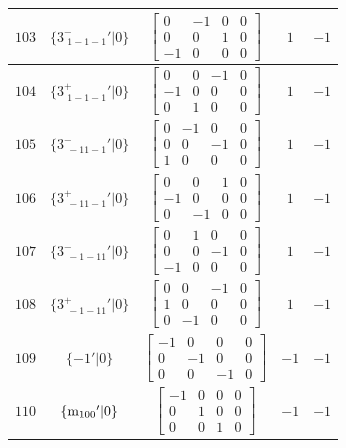 \documentclass[fleqn,8pt]{jsarticle}
\begin{document}
\begin{longtable}{ccccc}
$ 103 $ & $ \{3^{-}_{\,\,1-1-1}{}'|0\} $ & $ \begin{bmatrix} 0 & -1 & 0 & 0 \\ 0 & 0 & 1 & 0 \\ -1 & 0 & 0 & 0 \end{bmatrix} $ & $ 1 $ & $ -1 $ \\ \hline
$ 104 $ & $ \{3^{+}_{\,\,1-1-1}{}'|0\} $ & $ \begin{bmatrix} 0 & 0 & -1 & 0 \\ -1 & 0 & 0 & 0 \\ 0 & 1 & 0 & 0 \end{bmatrix} $ & $ 1 $ & $ -1 $ \\ \hline
$ 105 $ & $ \{3^{-}_{\,\,-11-1}{}'|0\} $ & $ \begin{bmatrix} 0 & -1 & 0 & 0 \\ 0 & 0 & -1 & 0 \\ 1 & 0 & 0 & 0 \end{bmatrix} $ & $ 1 $ & $ -1 $ \\ \hline
$ 106 $ & $ \{3^{+}_{\,\,-11-1}{}'|0\} $ & $ \begin{bmatrix} 0 & 0 & 1 & 0 \\ -1 & 0 & 0 & 0 \\ 0 & -1 & 0 & 0 \end{bmatrix} $ & $ 1 $ & $ -1 $ \\ \hline
$ 107 $ & $ \{3^{-}_{\,\,-1-11}{}'|0\} $ & $ \begin{bmatrix} 0 & 1 & 0 & 0 \\ 0 & 0 & -1 & 0 \\ -1 & 0 & 0 & 0 \end{bmatrix} $ & $ 1 $ & $ -1 $ \\ \hline
$ 108 $ & $ \{3^{+}_{\,\,-1-11}{}'|0\} $ & $ \begin{bmatrix} 0 & 0 & -1 & 0 \\ 1 & 0 & 0 & 0 \\ 0 & -1 & 0 & 0 \end{bmatrix} $ & $ 1 $ & $ -1 $ \\ \hline
$ 109 $ & $ \{-1{}'|0\} $ & $ \begin{bmatrix} -1 & 0 & 0 & 0 \\ 0 & -1 & 0 & 0 \\ 0 & 0 & -1 & 0 \end{bmatrix} $ & $ -1 $ & $ -1 $ \\ \hline
$ 110 $ & $ \{{\rm m}_{100}{}'|0\} $ & $ \begin{bmatrix} -1 & 0 & 0 & 0 \\ 0 & 1 & 0 & 0 \\ 0 & 0 & 1 & 0 \end{bmatrix} $ & $ -1 $ & $ -1 $ \\ \hline

\end{longtable}
\end{document}
